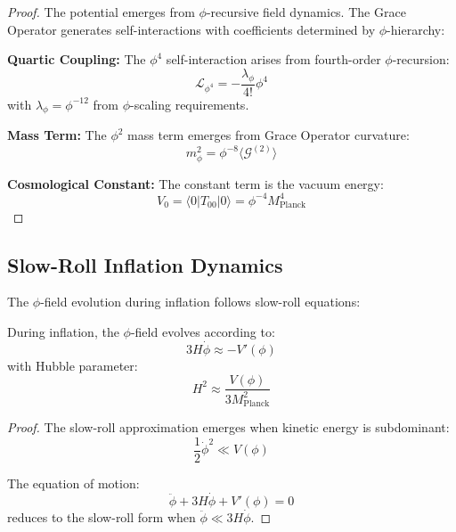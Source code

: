 \begin{proof}
The potential emerges from $\phi$-recursive field dynamics. The Grace Operator generates self-interactions with coefficients determined by $\phi$-hierarchy:

\textbf{Quartic Coupling:} The $\phi^4$ self-interaction arises from fourth-order $\phi$-recursion:
\begin{equation}
\mathcal{L}_{\phi^4} = -\frac{\lambda_\phi}{4!} \phi^4
\end{equation}
with $\lambda_\phi = \phi^{-12}$ from $\phi$-scaling requirements.

\textbf{Mass Term:} The $\phi^2$ mass term emerges from Grace Operator curvature:
\begin{equation}
m_\phi^2 = \phi^{-8} \langle \mathcal{G}^{(2)} \rangle
\end{equation}

\textbf{Cosmological Constant:} The constant term is the vacuum energy:
\begin{equation}
V_0 = \langle 0 | T_{00} | 0 \rangle = \phi^{-4} M_{\text{Planck}}^4
\end{equation}
\end{proof}

\subsection{Slow-Roll Inflation Dynamics}

The $\phi$-field evolution during inflation follows slow-roll equations:

\begin{theorem}
During inflation, the $\phi$-field evolves according to:
\begin{equation}
3H\dot{\phi} \approx -V'(\phi)
\label{eq:phi_slow_roll_equation}
\end{equation}
with Hubble parameter:
\begin{equation}
H^2 \approx \frac{V(\phi)}{3M_{\text{Planck}}^2}
\label{eq:inflation_hubble_parameter}
\end{equation}
\end{theorem}

\begin{proof}
The slow-roll approximation emerges when kinetic energy is subdominant:
\begin{equation}
\frac{1}{2}\dot{\phi}^2 \ll V(\phi)
\end{equation}

The equation of motion:
\begin{equation}
\ddot{\phi} + 3H\dot{\phi} + V'(\phi) = 0
\end{equation}
reduces to the slow-roll form when $\ddot{\phi} \ll 3H\dot{\phi}$.
\end{proof}

